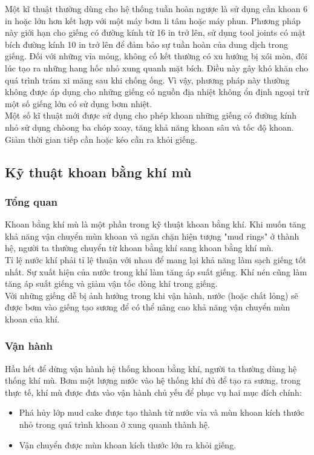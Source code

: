 \documentclass[12pt,a4paper]{article}
\begin{document}
	Một kĩ thuật thường dùng cho hệ thống tuần hoàn ngược là sử dụng cần khoan 6 in hoặc lớn hơn kết hợp với một máy bơm li tâm hoặc máy phun. Phương pháp này giới hạn cho giếng có đường kính từ 16 in trở lên, sử dụng tool joints có mặt bích đường kính 10 in trở lên để đảm bảo sự tuần hoàn của dung dịch trong giếng. Đối với những vỉa mỏng, không cố kết thường có xu hướng bị xói mòn, đôi lúc tạo ra những hang hốc nhỏ xung quanh mặt bích. Điều này gây khó khăn cho quá trình trám xi măng sau khi chống ống. Vì vậy, phương pháp này thường không được áp dụng cho những giếng có nguồn địa nhiệt không ổn định ngoại trừ một số giếng lớn có sử dụng bơm nhiệt.\\
	Một số kĩ thuật mới được sử dụng cho phép khoan những giếng có đường kính nhỏ sử dụng chòong ba chóp xoay, tăng khả năng khoan sâu và tốc độ khoan. Giảm thời gian tiếp cần hoặc kéo cần ra khỏi giếng.\\
\subsection{Kỹ thuật khoan bằng khí mù}
\subsubsection{Tổng quan}
	Khoan bằng khí mù\cite{rehm2013underbalanced} là một phần trong kỹ thuật khoan bằng khí. Khi muốn tăng khả năng vận chuyển mùn khoan và ngăn chặn hiện tượng "mud rings" ở thành hệ, người ta thường chuyển từ khoan bằng khí sang khoan bằng khí mù.\\
	Tỉ lệ nước khí phải tỉ lệ thuận với nhau để mang lại khả năng làm sạch giếng tốt nhất. Sự xuất hiện của nước trong khí làm tăng áp suất giếng. Khí nén cũng làm tăng áp suất giếng và giảm vận tốc dòng khí trong giếng.\\
	Với những giếng dễ bị ảnh hưởng trong khi vận hành, nước (hoặc chất lỏng) sẽ được bơm vào giếng tạo sương để có thể nâng cao khả năng vận chuyển mùn khoan của khí.
\subsubsection{Vận hành}
	Hầu hết để dừng vận hành hệ thống khoan bằng khí, người ta thường dùng hệ thống khí mù. Bơm một lượng nước vào hệ thống khí đủ để tạo ra sương, trong thực tế, khí mù được đưa vào vận hành chủ yếu để phục vụ hai mục đích chính:
	\begin{itemize}
		\item Phá hủy lớp mud cake được tạo thành từ nước vỉa và mùn khoan kích thước nhỏ trong quá trình khoan ở xung quanh thành hệ.
		\item Vận chuyển được mùn khoan kích thước lớn ra khỏi giếng.
	\end{itemize}
\end{document}
